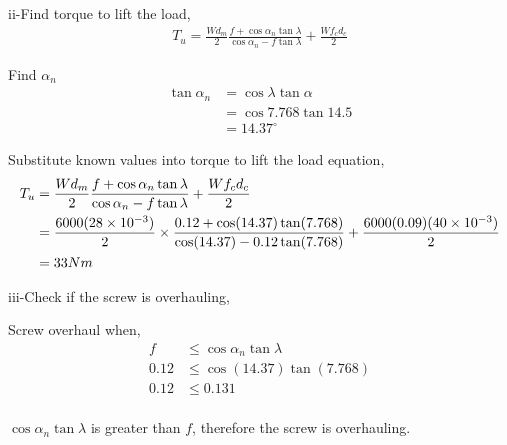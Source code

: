 \documentclass[a4paper, fleqn]{article}
\providecommand{\sci}[1]{\protect\ensuremath{\times 10^{\StrSubstitute[0]{#1}{e}{}}}}
\begin{document}
ii-Find torque to lift the load,
\begin{equation*}
    \begin{aligned}
    T_u = \frac{Wd_m}{2} \frac{f+\cos\alpha_n \tan\lambda}{\cos\alpha_n - f\tan\lambda} + \frac{Wf_c d_c}{2}
    \end{aligned}
\end{equation*}

Find $\alpha_n$
\begin{equation*}
    \begin{aligned}
    \tan \alpha_n &= \cos \lambda \tan \alpha\\
     &= \cos 7.768 \tan 14.5\\
    &= 14.37^{\circ}
    \end{aligned}
\end{equation*}

Substitute known values into torque to lift the load equation,
\begin{equation*}
    \begin{aligned}
    T_u &= \frac{Wd_m}{2} \frac{f+\cos\alpha_n \tan\lambda}{\cos\alpha_n - f\tan\lambda} + \frac{Wf_c d_c}{2} \\
    &= \frac{6000(28\sci{e-3})}{2} \times\frac{0.12+\cos(14.37) \tan(7.768)}{\cos(14.37) - 0.12\tan(7.768)} + \frac{6000(0.09)(40\sci{e-3})}{2} \\
    &= 33 Nm
    \end{aligned}
\end{equation*}

iii-Check if the screw is overhauling,

Screw overhaul when,
\begin{equation*}
    \begin{aligned}
    f &\le \cos \alpha_n \tan \lambda \\
    0.12 &\le \cos(14.37) \tan(7.768)\\
    0.12 &\le 0.131\\
    \end{aligned}
\end{equation*}

$\cos \alpha_n \tan \lambda$ is greater than $f$, therefore the screw is overhauling.


\end{document}
